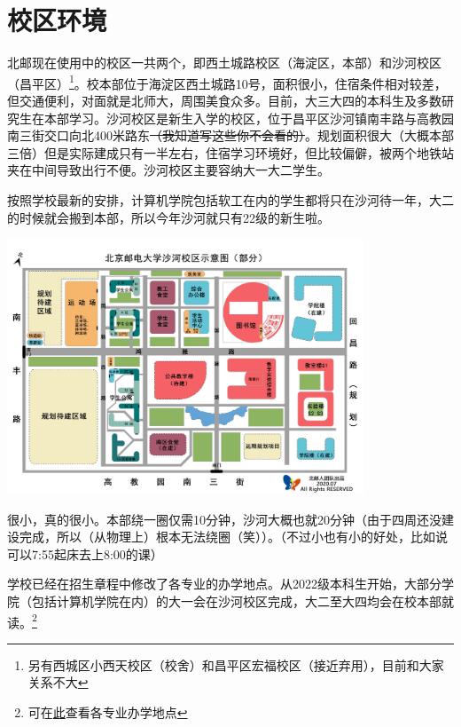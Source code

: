 \section{校区环境}

北邮现在使用中的校区一共两个，即西土城路校区（海淀区，本部）和沙河校区（昌平区）\footnote{另有西城区小西天校区（校舍）和昌平区宏福校区（接近弃用），目前和大家关系不大}。校本部位于海淀区西土城路10号，面积很小，住宿条件相对较差，但交通便利，对面就是北师大，周围美食众多。目前，大三大四的本科生及多数研究生在本部学习。沙河校区是新生入学的校区，位于昌平区沙河镇南丰路{\small{}与高教园南三街交口向北400米路东\sout{（我知道写这些你不会看的）}}。规划面积很大（大概本部三倍）但是实际建成只有一半左右，住宿学习环境好，但比较偏僻，被两个地铁站夹在中间导致出行不便。沙河校区主要容纳大一大二学生。

按照学校最新的安排，计算机学院包括软工在内的学生都将只在沙河待一年，大二的时候就会搬到本部，所以今年沙河就只有22级的新生啦。

\begin{center}
    \includegraphics[width=0.80\textwidth]{images/shahe-map.png}
\end{center}


很小，真的很小。本部绕一圈仅需10分钟，沙河大概也就20分钟（由于四周还没建设完成，所以（从物理上）根本无法绕圈（笑））。{\small （不过小也有小的好处，比如说可以7:55起床去上8:00的课）}


学校已经在招生章程中修改了各专业的办学地点。从2022级本科生开始，大部分学院（包括计算机学院在内）的大一会在沙河校区完成，大二至大四均会在校本部就读。\footnote{可在\href{https://zsb.bupt.edu.cn/info/1005/1720.htm}{此}查看各专业办学地点}

